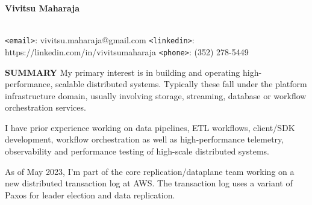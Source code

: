 \documentclass[10pt, letterpaper]{article}
\begin{document}
\begin{center}
\textbf{\Large Vivitsu Maharaja}
\date{}
\thispagestyle{empty}
\smallskip \\
\texttt{<email>}: vivitsu.maharaja@gmail.com \texttt{<linkedin>}: https://linkedin.com/in/vivitsumaharaja \texttt{<phone>}: (352) 278-5449
\end{center}

\textbf{SUMMARY}
\smallskip
\newline
My primary interest is in building and operating high-performance, scalable distributed systems. Typically these fall under
the platform infrastructure domain, usually involving storage, streaming, database or workflow orchestration services.

I have prior experience working on data pipelines, ETL workflows, client/SDK development, workflow orchestration as well as
high-performance telemetry, observability and performance testing of high-scale distributed systems.

As of May 2023, I'm part of the core replication/dataplane team working on a new distributed transaction log at AWS. The
transaction log uses a variant of Paxos for leader election and data replication.
\end{document}
